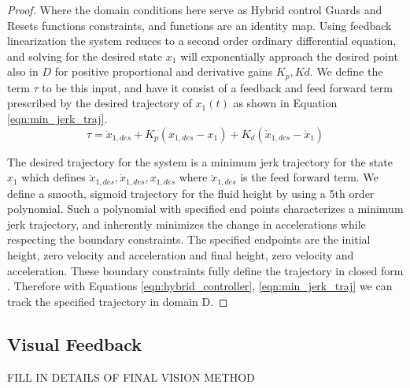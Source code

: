 \begin{proof}
Where the domain conditions here serve as Hybrid control Guards and Resets functions constraints, and functions are an identity map. Using feedback linearization the system reduces to a second order ordinary differential equation, and solving for the desired state $x_1$ will exponentially approach the desired point also in $D$ for positive proportional and derivative gains $K_p, Kd$.  We define the term $\tau$ to be this input, and have it consist of a feedback and feed forward term prescribed by the desired trajectory of $x_1(t)$ as shown in Equation \eqref{eqn:min_jerk_traj}.
\begin{equation}
\tau = \ddot{x}_{1,des} + K_p (x_{1,des} - x_1) + K_d(\dot{x}_{1,des} - \dot{x}_1) \label{eqn:min_jerk_traj}
\end{equation}

The desired trajectory for the system is a minimum jerk trajectory for the state $x_1$ which defines $\ddot{x}_{1,des},\dot{x}_{1,des}, x_{1,des}$ where $\ddot{x}_{1,des}$ is the feed forward term. We define a smooth, sigmoid trajectory for the fluid height by using a 5th order polynomial. Such a polynomial with specified end points characterizes a minimum jerk trajectory, and inherently minimizes the change in accelerations while respecting the boundary constraints. The specified endpoints are the initial height, zero velocity and acceleration and final height, zero velocity and acceleration. These boundary constraints fully define the trajectory in closed form \cite{zefran1998generation}. Therefore with Equations \eqref{eqn:hybrid_controller}, \eqref{eqn:min_jerk_traj} we can track the specified trajectory in domain D.
\end{proof}




\subsection{Visual Feedback}\label{sec:Visual_Feed}

{\color{red} FILL IN DETAILS OF FINAL VISION METHOD}





